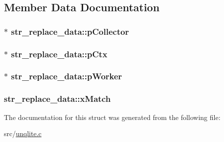 \subsection{Member Data Documentation}
\hypertarget{structstr__replace__data_afabcfd4e57bd32f1e50dbb3360665218}{
\subsubsection[{p\-Collector}]{$\ast$ str\-\_\-replace\-\_\-data\-::p\-Collector}}\label{d1/d2f/structstr__replace__data_afabcfd4e57bd32f1e50dbb3360665218}
\hypertarget{structstr__replace__data_a54d044610592602295a97226f30dceef}{
\subsubsection[{p\-Ctx}]{$\ast$ str\-\_\-replace\-\_\-data\-::p\-Ctx}}\label{d1/d2f/structstr__replace__data_a54d044610592602295a97226f30dceef}
\hypertarget{structstr__replace__data_ac00d5da5bceebdd3b8a602c809b37819}{
\subsubsection[{p\-Worker}]{$\ast$ str\-\_\-replace\-\_\-data\-::p\-Worker}}\label{d1/d2f/structstr__replace__data_ac00d5da5bceebdd3b8a602c809b37819}
\hypertarget{structstr__replace__data_a702650ba2d49dd96bedbb9ba754d5760}{
\subsubsection[{x\-Match}]{ str\-\_\-replace\-\_\-data\-::x\-Match}}\label{d1/d2f/structstr__replace__data_a702650ba2d49dd96bedbb9ba754d5760}


The documentation for this struct was generated from the following file\-:\begin{DoxyCompactItemize}
\item 
src/\hyperlink{unqlite_8c}{unqlite.\-c}\end{DoxyCompactItemize}
